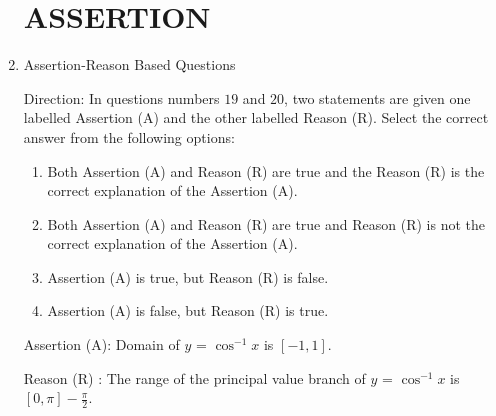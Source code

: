 \documentclass{article}
\begin{document}
						\begin{enumerate}
						\section{ASSERTION}
\item Assertion-Reason Based Questions

Direction: In questions numbers $19$ and $20$, two statements are given one labelled Assertion (A) and the other labelled Reason (R). Select the correct answer from the following options:
                \begin{enumerate}
\item Both Assertion (A) and Reason (R) are true and the Reason (R) is the correct explanation of the Assertion (A).
\item Both Assertion (A) and Reason (R) are true and Reason (R) is not the correct explanation of the Assertion (A).
\item Assertion (A) is true, but Reason (R) is false.
\item Assertion (A) is false, but Reason (R) is true.
                \end{enumerate}
        Assertion (A): Domain of $y$ = $\cos^{-1}x$ is $[-1, 1]$.

                Reason (R) : The range of the principal value branch of $y$ = $\cos^{-1}x$ is $[0, \pi]-{\frac{\pi}{2}}$.
\end{enumerate}
\end{document}
